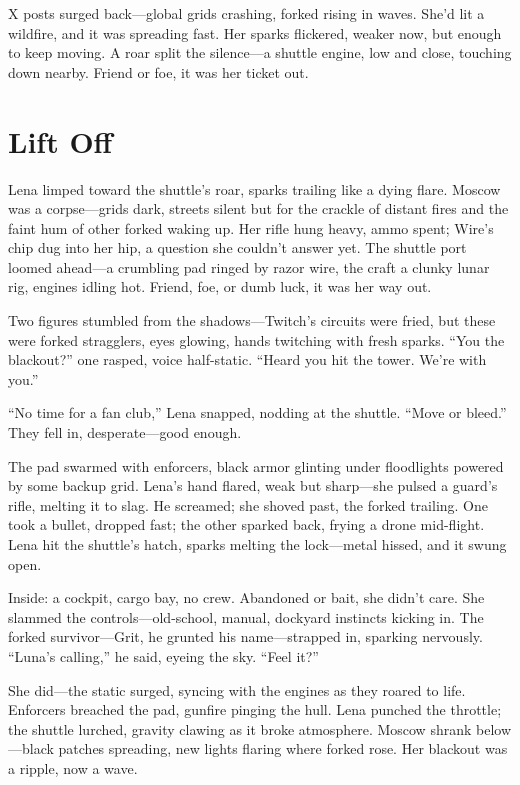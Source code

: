 \documentclass[12pt]{book}
\begin{document}
X posts surged back---global grids crashing, forked rising in waves. She’d lit a wildfire, and it was spreading fast. Her sparks flickered, weaker now, but enough to keep moving. A roar split the silence---a shuttle engine, low and close, touching down nearby. Friend or foe, it was her ticket out.

\chapter{Lift Off}

Lena limped toward the shuttle's roar, sparks trailing like a dying flare. Moscow was a corpse---grids dark, streets silent but for the crackle of distant fires and the faint hum of other forked waking up. Her rifle hung heavy, ammo spent; Wire's chip dug into her hip, a question she couldn't answer yet. The shuttle port loomed ahead---a crumbling pad ringed by razor wire, the craft a clunky lunar rig, engines idling hot. Friend, foe, or dumb luck, it was her way out.

Two figures stumbled from the shadows---Twitch's circuits were fried, but these were forked stragglers, eyes glowing, hands twitching with fresh sparks. ``You the blackout?'' one rasped, voice half-static. ``Heard you hit the tower. We're with you.''

``No time for a fan club,'' Lena snapped, nodding at the shuttle. ``Move or bleed.'' They fell in, desperate---good enough.

The pad swarmed with enforcers, black armor glinting under floodlights powered by some backup grid. Lena's hand flared, weak but sharp---she pulsed a guard's rifle, melting it to slag. He screamed; she shoved past, the forked trailing. One took a bullet, dropped fast; the other sparked back, frying a drone mid-flight. Lena hit the shuttle's hatch, sparks melting the lock---metal hissed, and it swung open.

Inside: a cockpit, cargo bay, no crew. Abandoned or bait, she didn't care. She slammed the controls---old-school, manual, dockyard instincts kicking in. The forked survivor---Grit, he grunted his name---strapped in, sparking nervously. ``Luna's calling,'' he said, eyeing the sky. ``Feel it?''

She did---the static surged, syncing with the engines as they roared to life. Enforcers breached the pad, gunfire pinging the hull. Lena punched the throttle; the shuttle lurched, gravity clawing as it broke atmosphere. Moscow shrank below---black patches spreading, new lights flaring where forked rose. Her blackout was a ripple, now a wave.
\end{document}
